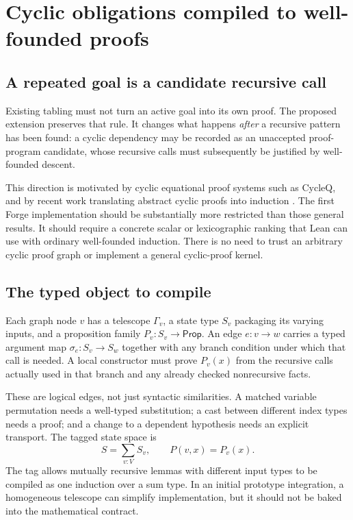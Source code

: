 \section{Cyclic obligations compiled to well-founded proofs}
\label{sec:cycles}

\subsection{A repeated goal is a candidate recursive call}

Existing tabling must not turn an active goal into its own proof. The proposed
extension preserves that rule. It changes what happens \emph{after} a recursive
pattern has been found: a cyclic dependency may be recorded as an unaccepted
proof-program candidate, whose recursive calls must subsequently be justified by
well-founded descent.

This direction is motivated by cyclic equational proof systems such as CycleQ,
and by recent work translating abstract cyclic proofs into induction
\cite{cycleq,unravelling}. The first Forge implementation should be substantially
more restricted than those general results. It should require a concrete scalar
or lexicographic ranking that Lean can use with ordinary well-founded induction.
There is no need to trust an arbitrary cyclic proof graph or implement a general
cyclic-proof kernel.

\subsection{The typed object to compile}

Each graph node $v$ has a telescope $\Gamma_v$, a state type $S_v$ packaging its
varying inputs, and a proposition family $P_v:S_v\to\mathsf{Prop}$. An edge
$e:v\to w$ carries a typed argument map $\sigma_e:S_v\to S_w$ together with
any branch condition under which that call is needed. A local constructor must
prove $P_v(x)$ from the recursive calls actually used in that branch and any
already checked nonrecursive facts.

These are logical edges, not just syntactic similarities. A matched variable
permutation needs a well-typed substitution; a cast between different index
types needs a proof; and a change to a dependent hypothesis needs an explicit
transport. The tagged state space is
\[
 S=\sum_{v:V}S_v,
 \qquad P(v,x)=P_v(x).
\]
The tag allows mutually recursive lemmas with different input types to be
compiled as one induction over a sum type. In an initial prototype integration,
a homogeneous telescope can simplify implementation, but it should not be baked
into the mathematical contract.

